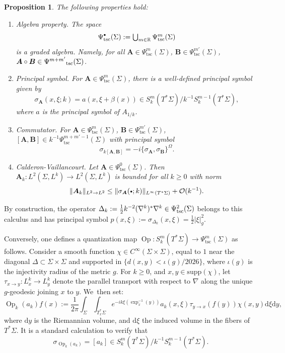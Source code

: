 \documentclass[10pt,a4paper]{amsart}
\newcommand{\sbullet}{{\scriptscriptstyle\bullet}}
\newcommand{\csbullet}{{\raisebox{1pt}{$\sbullet$}}}
\newcommand{\bA}{\boldsymbol{A}}
\newcommand{\bB}{\boldsymbol{B}}
\theoremstyle{plain}
\newtheorem{proposition}[theorem]{Proposition}
\theoremstyle{definition}
\let\mc\mathcal
\newcommand{\R}{\mathbb{R}}
\newcommand{\dd}{\mathrm{d}}
\DeclareMathOperator{\Op}{Op}
\begin{document}
\begin{proposition}
The following properties hold:

\begin{enumerate}

\item \emph{Algebra property.} The space
\[\textstyle
\Psi^\csbullet_{\mathrm{tsc}}(\Sigma) := \bigcup_{m \in \R} \Psi^m_{\mathrm{tsc}}(\Sigma)
\]
is a graded algebra. Namely, for all $\bA\in\Psi^m_{\mathrm{tsc}}(\Sigma)$, $\bB\in\Psi^{m'}_{\mathrm{tsc}}(\Sigma)$, $\bA \circ \bB \in \Psi^{\color{black}m+m'}_{\mathrm{tsc}}(\Sigma)$.

\item \emph{Principal symbol.} For $\bA \in \Psi^m_{\mathrm{tsc}}(\Sigma)$, there is a well-defined principal symbol given by
\[
\sigma_{\bA}(x,\xi ; k) = a(x,\xi + \beta(x)) \in
S^m_{k}(T^*\Sigma)/k^{-1}S^{m-1}_{k}(T^*\Sigma),
\]
where $a$ is the principal symbol of $A_{1/k}$.

\item \emph{Commutator.} For $\bA \in \Psi^m_{\mathrm{tsc}}(\Sigma)$, $\bB \in \Psi^{m'}_{\mathrm{tsc}}(\Sigma)$, $[\bA,\bB] \in k^{-1}\Psi^{m+m'-1}_{\mathrm{tsc}}(\Sigma)$ with principal symbol
\[
\sigma_{k[\bA,\bB]} = -i \{\sigma_{\bA},\sigma_{\bB}\}^\Omega.
\]

\item \emph{Calderon-Vaillancourt.} Let $\bA \in \Psi^0_{\mathrm{tsc}}(\Sigma)$. Then $\bA_k : L^2(\Sigma,L^k) \to L^2(\Sigma,L^k)$ is bounded for all $k \geq 0$ with norm
\[
\|\bA_k\|_{L^2 \to L^2} \leq \|\sigma_{\bA}(\csbullet;k)\|_{L^\infty(T^*\Sigma)} + \mc{O}(k^{-1}).
\]

\end{enumerate}

\end{proposition}

By construction, the operator $\Delta_k := \tfrac{1}{2} {\color{black}k^{-2}} (\nabla^k)^*\nabla^k \in \Psi^2_{\mathrm{tsc}}(\Sigma)$ belongs to this calculus and has principal symbol $p(x,\xi) := \sigma_{\Delta_k}(x,\xi) = \tfrac{1}{2}|\xi|^2_g$.

Conversely, one defines a quantization map $\Op : S^m_{k}(T^*\Sigma) \to \Psi^m_{\mathrm{tsc}}(\Sigma)$ as follows. Consider a smooth function $\chi \in C^\infty(\Sigma \times \Sigma)$, equal to $1$ near the diagonal $\Delta \subset \Sigma \times \Sigma$ and supported in $\{d(x,y) < \iota(g)/2026\}$, where $\iota(g)$ is the injectivity radius of the metric $g$. For $k \geq 0$, and $x,y \in \mathrm{supp}(\chi)$, let $\tau_{x \to y} : L^k_x \to L^k_y$ denote the parallel transport with respect to $\nabla$ along the unique $g$-geodesic joining $x$ to $y$. We~then set:
\[
\Op_{k}(a_{k}) f(x) := \dfrac{1}{2\pi} \int_{\Sigma} \int_{T^*_x\Sigma} e^{-ik\xi(\exp^{-1}_x(y))} a_{k}(x,\xi) \tau_{y \to x}(f(y)) \chi(x,y) \dd\xi \dd y,
\]
where $\dd y$ is the Riemannian volume, and $\dd\xi$ the induced volume in the fibers of $T^*\Sigma$. It is a standard calculation to verify that
\[
\sigma_{\Op_{k}(a_{k})} = [a_{k}] \in S^m_{k}(T^*\Sigma)/k^{-1}S^{m-1}_{k}(T^*\Sigma).
\]
\end{document}
